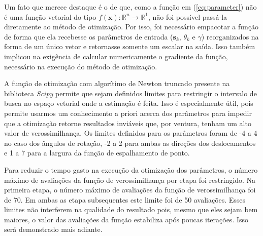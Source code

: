 Um fato que merece destaque é o de que, como a função em (\ref{eq:parameter}) não é uma
função vetorial do tipo $ f(\mathbf{x}) : \mathbb{R}^n \to \mathbb{R}^1 $, não foi 
possível passá-la diretamente ao método de otimização.
Por isso, foi necessário empacotar a função de forma que ela recebesse os parâmetros de
entrada ($\mathbf{s}_k$, $\theta_k$ e $\gamma$) reorganizados na forma de um único
vetor e retornasse somente um escalar na saída.
Isso também implicou na exigência de calcular numericamente o gradiente da função,
necessário na execução do método de otimização.

A função de otimização com algorítimo de Newton truncado presente na biblioteca
\emph{Scipy} permite que sejam definidos limites para restringir o intervalo de busca
no espaço vetorial onde a estimação é feita.
Isso é especialmente útil, pois permite usarmos um conhecimento a priori acerca dos
parâmetros para impedir que a otimização retorne resultados inviáveis que, por ventura,
tenham um alto valor de verossimilhança.
Os limites definidos para os parâmetros foram de -4 a 4 no caso dos ângulos de rotação,
-2 a 2 para ambas as direções dos deslocamentos e 1 a 7 para a largura da função de
espalhamento de ponto.

Para reduzir o tempo gasto na execução da otimização dos parâmetros, o número máximo de avaliações da função de verossimilhança por etapa foi restringido.
Na primeira etapa, o número máximo de avaliações da função de verossimilhança foi de 70.
Em ambas as etapa subsequentes este limite foi de 50 avaliações.
Esses limites não interferem na qualidade do resultado pois, mesmo que eles sejam bem maiores, o valor das avaliações da função estabiliza após poucas iterações.
Isso será demonstrado mais adiante.

